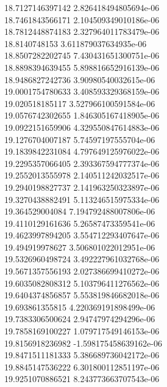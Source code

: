 {18.7127146397142 2.826418494805694e-06 \\
18.7461843566171 2.104509349010186e-06 \\
18.7812448874183 2.327964011783479e-06 \\
18.8140748153 3.611879037634935e-06 \\
18.8507282202745 7.430431651300751e-06 \\
18.8898394639455 5.898816652916139e-06 \\
18.9486827242736 3.90980540032615e-06 \\
19.0001754780633 3.408593329368159e-06 \\
19.020518185117 3.527966100591584e-06 \\
19.0576742302655 1.846305167418905e-06 \\
19.0922151659906 4.329550847614883e-06 \\
19.1276704007187 5.74597197555704e-06 \\
19.1839842231084 4.797649125976022e-06 \\
19.2295357066405 2.393367594777374e-06 \\
19.2552013555978 2.140511242032517e-06 \\
19.2940198827737 2.141963250323897e-06 \\
19.3270438882491 5.113246515975334e-06 \\
19.364529004084 7.194792488007806e-06 \\
19.4110129161636 5.26587473359541e-06 \\
19.4623997894205 3.554712293407647e-06 \\
19.494919978627 3.506801022012951e-06 \\
19.5326960498724 3.492227961032768e-06 \\
19.5671357556193 2.027386699410272e-06 \\
19.6035082808312 5.103796411276562e-06 \\
19.6404374856857 5.553819846682018e-06 \\
19.693861355815 4.220369191898499e-06 \\
19.7383306500624 2.94747974294296e-06 \\
19.7858169100227 1.079717549146153e-06 \\
19.8156918236982 -1.598175458639162e-06 \\
19.8471511181333 5.386689736042172e-06 \\
19.8845147536222 6.301800112851197e-06 \\
19.9251070886521 8.243773663707543e-06 \\
}
